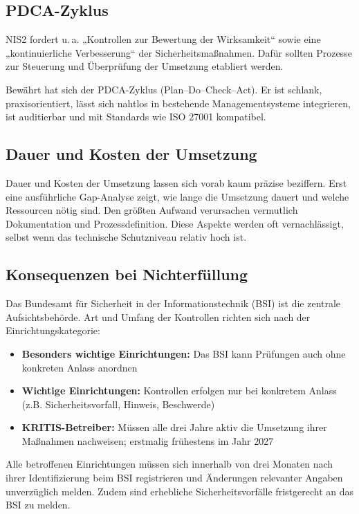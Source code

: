 \subsection{PDCA-Zyklus}
NIS2 fordert u.\,a. „Kontrollen zur Bewertung der Wirksamkeit“ sowie eine „kontinuierliche Verbesserung“ der Sicherheitsmaßnahmen. Dafür sollten Prozesse zur Steuerung und Überprüfung der Umsetzung etabliert werden.

Bewährt hat sich der PDCA-Zyklus (Plan–Do–Check–Act). Er ist schlank, praxisorientiert, lässt sich nahtlos in bestehende Managementsysteme integrieren, ist auditierbar und mit Standards wie ISO 27001 kompatibel.

\subsection{Dauer und Kosten der Umsetzung}
Dauer und Kosten der Umsetzung lassen sich vorab kaum präzise beziffern. Erst eine ausführliche Gap-Analyse zeigt, wie lange die Umsetzung dauert und welche Ressourcen nötig sind.
Den größten Aufwand verursachen vermutlich Dokumentation und Prozessdefinition. Diese Aspekte werden oft vernachlässigt, selbst wenn das technische Schutzniveau relativ hoch ist.

\newpage
\subsection{Konsequenzen bei Nichterfüllung}

Das Bundesamt für Sicherheit in der Informationstechnik (BSI) ist die zentrale Aufsichtsbehörde. Art und Umfang der Kontrollen richten sich nach der Einrichtungskategorie:
\begin{itemize}
    \item \textbf{Besonders wichtige Einrichtungen:} Das BSI kann Prüfungen auch ohne konkreten Anlass anordnen
    \item \textbf{Wichtige Einrichtungen:} Kontrollen erfolgen nur bei konkretem Anlass (z.B. Sicherheitsvorfall, Hinweis, Beschwerde)
    \item \textbf{KRITIS-Betreiber:} Müssen alle drei Jahre aktiv die Umsetzung ihrer Maßnahmen nachweisen; erstmalig frühestens im Jahr 2027
\end{itemize}

Alle betroffenen Einrichtungen müssen sich innerhalb von drei Monaten nach ihrer Identifizierung beim BSI registrieren und Änderungen relevanter Angaben unverzüglich melden. Zudem sind erhebliche Sicherheitsvorfälle fristgerecht an das BSI zu melden.

